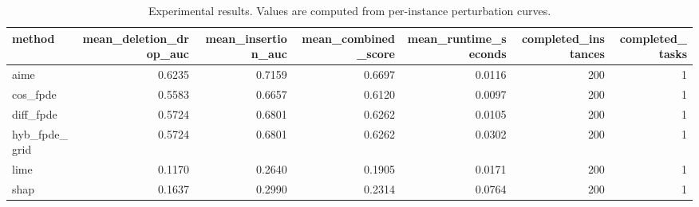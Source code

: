 \begin{table}[t]
\caption{Experimental results. Values are computed from per-instance perturbation curves.}
\label{tab:main_results_computed}
\centering
\begin{tabular}{lrrrrrr}
\toprule
method & mean\_deletion\_drop\_auc & mean\_insertion\_auc & mean\_combined\_score & mean\_runtime\_seconds & completed\_instances & completed\_tasks \\
\midrule
aime & 0.6235 & 0.7159 & 0.6697 & 0.0116 & 200 & 1 \\
cos\_fpde & 0.5583 & 0.6657 & 0.6120 & 0.0097 & 200 & 1 \\
diff\_fpde & 0.5724 & 0.6801 & 0.6262 & 0.0105 & 200 & 1 \\
hyb\_fpde\_grid & 0.5724 & 0.6801 & 0.6262 & 0.0302 & 200 & 1 \\
lime & 0.1170 & 0.2640 & 0.1905 & 0.0171 & 200 & 1 \\
shap & 0.1637 & 0.2990 & 0.2314 & 0.0764 & 200 & 1 \\
\bottomrule
\end{tabular}

\end{table}
